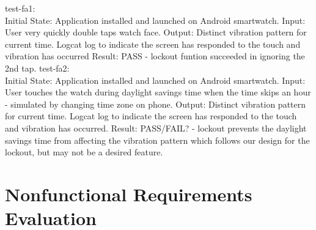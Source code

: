 \documentclass[12pt, titlepage]{article}
\begin{document}
\noindent
test-fa1: \\
\newline
\noindent
Initial State: Application installed and launched on Android smartwatch.
\newline
\noindent
Input: User very quickly double taps watch face.
\newline
\noindent
Output: Distinct vibration pattern for current time. Logcat log to indicate the screen has responded to the touch and vibration has occurred
\newline
\noindent
Result: PASS - lockout funtion succeeded in ignoring the 2nd tap.
\newline
\noindent
\newline
\noindent
test-fa2: \\
\newline
\noindent
Initial State: Application installed and launched on Android smartwatch.
\newline
\noindent
Input: User touches the watch during daylight savings time when the
time skips an hour - simulated by changing time zone on phone.
\newline
\noindent
Output: Distinct vibration pattern for current time. Logcat log to indicate the screen has responded to the touch and vibration has occurred.
\newline
\noindent
Result: PASS/FAIL? - lockout prevents the daylight savings time from affecting the vibration pattern which follows our design for the lockout, but may not be a desired feature.

\section{Nonfunctional Requirements Evaluation}
\end{document}
